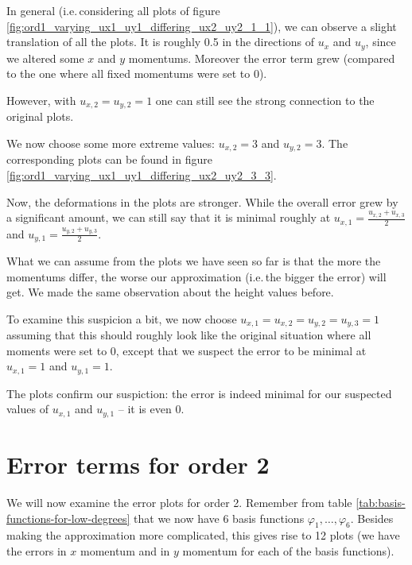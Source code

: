 \documentclass{article}
\renewcommand{\phi}{\varphi}
\begin{document}
In general (i.e.\,considering all plots of figure \ref{fig:ord1_varying_ux1_uy1_differing_ux2_uy2_1_1}), we can observe a slight translation of all the plots. It is roughly 0.5 in the directions of $u_x$ and $u_y$, since we altered some $x$ and $y$ momentums. Moreover the error term grew (compared to the one where all fixed momentums were set to 0).

However, with $u_{x,2}=u_{y,2}=1$ one can still see the strong connection to the original plots.

We now choose some more extreme values: $u_{x,2}=3$ and $u_{y,2}=3$. The corresponding plots can be found in figure \ref{fig:ord1_varying_ux1_uy1_differing_ux2_uy2_3_3}.



Now, the deformations in the plots are stronger. While the overall error grew by a significant amount, we can still say that it is minimal roughly at $u_{x,1}=\frac{u_{x,2}+u_{x,3}}{2}$ and $u_{y,1}=\frac{u_{y,2}+u_{y,3}}{2}$.

What we can assume from the plots we have seen so far is that the more the momentums differ, the worse our approximation (i.e.\,the bigger the error) will get. We made the same observation about the height values before.

To examine this suspicion a bit, we now choose $u_{x,1}=u_{x,2}=u_{y,2}=u_{y,3}=1$ assuming that this should roughly look like the original situation where all moments were set to 0, except that we suspect the error to be minimal at $u_{x,1}=1$ and $u_{y,1}=1$.



The plots confirm our suspiction: the error is indeed minimal for our suspected values of $u_{x,1}$ and $u_{y,1}$ -- it is even 0.

\clearpage{}

\section{Error terms for order 2}
\label{sec:stiffness-analyis-ord-2}

We will now examine the error plots for order 2. Remember from table \ref{tab:basis-functions-for-low-degrees} that we now have 6 basis functions $\phi_1,\dots,\phi_6$. Besides making the approximation more complicated, this gives rise to 12 plots (we have the errors in $x$ momentum and in $y$ momentum for each of the basis functions).
\end{document}
